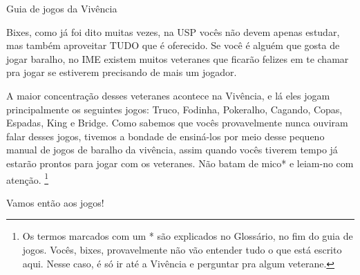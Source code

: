 \begin{secao}{Guia de jogos da Vivência }

Bixes, como já foi dito muitas vezes, na USP vocês não devem apenas estudar, mas
também aproveitar TUDO que é oferecido. Se você é alguém que gosta de jogar
baralho, no IME existem muitos veteranes que ficarão felizes em te chamar pra
jogar se estiverem precisando de mais um jogador.

A maior concentração desses veteranes acontece na Vivência, e lá eles jogam
principalmente os seguintes jogos: Truco, Fodinha, Pokeralho, Cagando, Copas, Espadas,
King e Bridge. Como sabemos que vocês provavelmente nunca ouviram falar desses jogos,
tivemos a bondade de ensiná-los por meio desse pequeno manual de jogos de baralho da
vivência, assim quando vocês tiverem tempo já estarão prontos para jogar com os veteranes.
Não batam de mico* e leiam-no com atenção. \footnote{Os termos marcados com um * são explicados
no Glossário, no fim do guia de jogos. Vocês, bixes, provavelmente não vão entender tudo o que
está escrito aqui. Nesse caso, é só ir até a Vivência e perguntar pra algum veterane.}

Vamos então aos jogos!







\pagebreak




\end{secao}
